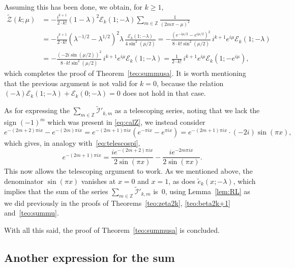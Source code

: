 \documentclass[11pt, oneside]{article}
\newcommand{\Z}{\mathbb{Z}}
\newcommand{\calE}{\mathcal{E}}
\newcommand{\calI}{\mathcal{I}}
\newcommand{\calZ}{\mathcal{Z}}
\theoremstyle{plain}
\theoremstyle{definition}
\begin{document}
Assuming this has been done, we obtain, for $k \geq 1$,
\begin{align*}
  \widetilde{\calZ}(k;\mu) 
  &= -\frac{i^{k+1}}{2\cdot k!} (1-\lambda)^2 \calE_{k}(1;-\lambda) 
    \sum_{m\in\Z} \frac{1}{(2m\pi-\mu)^2} \\
  &= -\frac{i^{k+1}}{2 \cdot k!} (\lambda^{-1/2}-\lambda^{1/2})^2 \lambda \,
    \frac{\calE_{k}(1;-\lambda)}{4 \sin^2(\mu/2)} 
  = -\frac{(e^{-i\mu/2}-e^{i\mu/2})^2}{8 \cdot k! \sin^2(\mu/2)} 
    \, i^{k+1} e^{i\mu} \calE_{k}(1;-\lambda) \\
  &= -\frac{(-2i\sin(\mu/2))^2}{8 \cdot k! \sin^2(\mu/2)} 
    \, i^{k+1} e^{i\mu} \calE_{k}(1;-\lambda) 
  = \frac{1}{2 \cdot k!} \, i^{k+1} e^{i\mu} \calE_{k}(1;-e^{i\mu}),
\end{align*}
which completes the proof of Theorem~\ref{teo:summusa}.
It is worth mentioning that the previous argument is not valid for $k = 0$, because the
relation $(-\lambda)\calE_{k}(1;-\lambda) + \calE_{k}(0;-\lambda) = 0$ does not hold in that case.


As for expressing the $\sum_{m\in\Z} \widetilde{\calI}'_{k,m}$ as a telescoping series, noting that we lack the sign $(-1)^m$ which was present in \eqref{eq:calZ}, we instead consider
\[
  e^{-(2m+2)\pi ix} - e^{-(2m)\pi ix} = e^{-(2m+1)\pi ix} (e^{-\pi ix} - e^{\pi ix}) 
  = e^{-(2m+1)\pi ix} \cdot (-2 i) \sin(\pi x),
\]
which gives, in analogy with~\eqref{eq:telescospi},
\begin{equation}
\label{eq:telessinpi}
  e^{-(2m+1)\pi ix} = \frac{ie^{-(2m+2)\pi ix}}{2\sin(\pi x)} 
  - \frac{ie^{-2m\pi ix}}{2\sin(\pi x)}.
\end{equation}
This now allows the telescoping argument to work. As we mentioned above, the denominator $\sin(\pi x)$ vanishes at $x=0$ and $x=1$, as does $\widetilde{e}_{k}(x;-\lambda)$, which implies that the sum of the series $\sum_{m\in\Z} \widetilde{\calI}'_{k,m}$ is~$0$, using Lemma~\ref{lem:RL} as we did previously in the proofs of Theorems~\ref{teo:zeta2k}, \ref{teo:beta2k+1} and~\ref{teo:summu}.

With all this said, the proof of Theorem~\ref{teo:summusa} is concluded.

\subsection{Another expression for the sum}
\end{document}
